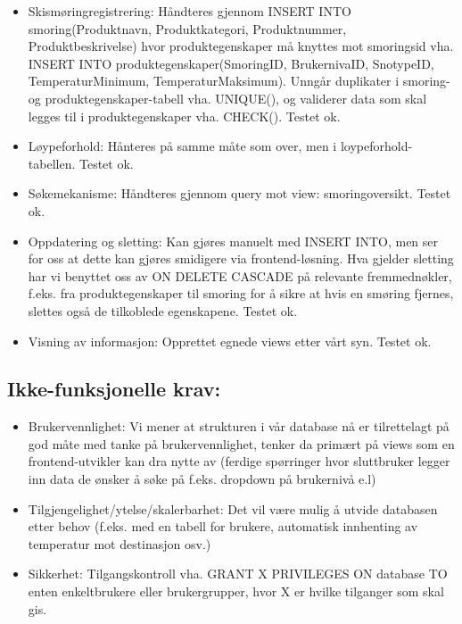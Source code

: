 \documentclass[10pt, a4paper]{article}
\begin{document}
\begin{itemize}
	\item Skismøringregistrering: Håndteres gjennom INSERT INTO smoring(Produktnavn, Produktkategori, Produktnummer, Produktbeskrivelse) hvor produktegenskaper må knyttes mot smoringsid vha. INSERT INTO produktegenskaper(SmoringID, BrukernivaID, SnotypeID, TemperaturMinimum, TemperaturMaksimum). Unngår duplikater i smoring- og produktegenskaper-tabell vha. UNIQUE(), og validerer data som skal legges til i produktegenskaper vha. CHECK(). Testet ok.
	\item Løypeforhold: Hånteres på samme måte som over, men i loypeforhold-tabellen. Testet ok.
	\item Søkemekanisme: Håndteres gjennom query mot view: smoringoversikt. Testet ok.
	\item Oppdatering og sletting: Kan gjøres manuelt med INSERT INTO, men ser for oss at dette kan gjøres smidigere via frontend-løsning. Hva gjelder sletting har vi benyttet oss av ON DELETE CASCADE på relevante fremmednøkler, f.eks. fra produktegenskaper til smoring for å sikre at hvis en smøring fjernes, slettes også de tilkoblede egenskapene. Testet ok.
	\item Visning av informasjon:  Opprettet egnede views etter vårt syn. Testet ok.
\end{itemize}

\subsection{Ikke-funksjonelle krav:}

\begin{itemize}
	\item Brukervennlighet: Vi mener at strukturen i vår database nå er tilrettelagt på god måte med tanke på brukervennlighet, tenker da primært på views som en frontend-utvikler kan dra nytte av (ferdige spørringer hvor sluttbruker legger inn data de ønsker å søke på f.eks. dropdown på brukernivå e.l) 
	\item Tilgjengelighet/ytelse/skalerbarhet: Det vil være mulig å utvide databasen etter behov (f.eks. med en tabell for brukere, automatisk innhenting av temperatur mot destinasjon osv.) 
	\item Sikkerhet: Tilgangskontroll vha. GRANT X PRIVILEGES ON database TO enten enkeltbrukere eller brukergrupper, hvor X er hvilke tilganger som skal gis.
\end{itemize}

\end{document}
